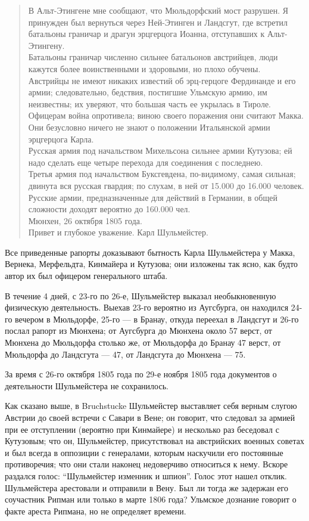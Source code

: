 \documentclass[
  oneside,
  12pt,
  titlepage]{book}
\begin{document}
\begin{quote}
В Альт-Этингене мне сообщают, что Мюльдорфский мост разрушен. Я принужден был вернуться через Ней-Этинген и Ландсгут, где встретил батальоны граничар и драгун эрцгерцога Иоанна, отступавших к Альт-Этингену.\\
Батальоны граничар численно сильнее батальонов австрийцев, люди кажутся более воинственными и здоровыми, но плохо обучены.\\
Австрийцы не имеют никаких известий об эрц-герцоге Фердинанде и его армии; следовательно, бедствия, постигшие Ульмскую армию, им неизвестны; их уверяют, что большая часть ее укрылась в Тироле. Офицерам война опротивела; виною своего поражения они считают Макка. Они безусловно ничего не знают о положении Итальянской армии эрцгерцога Карла.\\
Русская армия под начальством Михельсона сильнее армии Кутузова; ей надо сделать еще четыре перехода для соединения с последнею.\\
Третья армия под начальством Буксгевдена, по-видимому, самая сильная; двинута вся русская гвардия; по слухам, в ней от 15.000 до 16.000 человек. Русские армии, предназначенные для действий в Германии, в общей сложности доходят вероятно до 160.000 чел.\\
Мюнхен, 26 октября 1805 года.\\
Привет и глубокое уважение. Карл Шульмейстер.
\end{quote}

Все приведенные рапорты доказывают бытность Карла Шульмейстера у Макка, Вернека, Мерфельдта, Кинмайера и Кутузова; они изложены так ясно, как будто автор их был офицером генерального штаба.

В течение 4 дней, с 23-го по 26-е, Шульмейстер выказал необыкновенную физическую деятельность. Выехав 23-го вероятно из Аугсбурга, он находился 24-го вечером в Мюльдорфе, 25-го --- в Бранау, откуда переехал в Ландсгут и 26-го послал рапорт из Мюнхена; от Аугсбурга до Мюнхена около 57 верст, от Мюнхена до Мюльдорфа столько же, от Мюльдорфа до Бранау 47 верст, от Мюльдорфа до Ландсгута --- 47, от Ландсгута до Мюнхена --- 75.

За время с 26-го октября 1805 года по 29-е ноября 1805 года документов о деятельности Шульмейстера не сохранилось.

Как сказано выше, в Bruchstucke Шульмейстер выставляет себя верным слугою Австрии до своей встречи с Савари в Вене; он говорит, что следовал за армией при ее отступлении (вероятно при Кинмайере) и несколько раз беседовал с Кутузовым; что он, Шульмейстер, присутствовал на австрийских военных советах и был всегда в оппозиции с генералами, которым наскучили его постоянные противоречия; что они стали наконец недоверчиво относиться к нему. Вскоре раздался голос: ``Шульмейстер изменник и шпион''. Голос этот нашел отклик. Шульмейстера арестовали и отправили в Вену. Был ли тогда же задержан его соучастник Рипман или только в марте 1806 года? Ульмское дознание говорит о факте ареста Рипмана, но не определяет времени.
\end{document}
